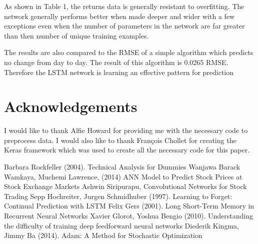 \documentclass[11pt]{article}
\begin{document}
As shown in Table 1, the returns data is generally resistant to overfitting. The network generally performs better when made deeper and wider with a few exceptions even when the number of parameters in the network are far greater than then number of unique training examples.

The results are also compared to the RMSE of a simple algorithm which predicts no change from day to day. The result of this algorithm is 0.0265 RMSE. Therefore the LSTM network is learning an effective pattern for prediction

\section*{Acknowledgements}

I would like to thank Alfie Howard for providing me with the necessary code to preprocess data. I would also like to thank Fran\c{c}ois Chollet for creating the Keras framework which was used to create all the necessary code for this paper.

\begin{thebibliography}{9}

 Barbara Rockfeller (2004). Technical Analysis for Dummies
 Wanjawa Barack Wamkaya, Muchemi Lawrence, (2014) ANN Model to Predict Stock Prices at Stock Exchange Markets
 Ashwin Siripurapu, Convolutional Networks for Stock Trading
 Sepp Hochreiter, Jurgen Schmidhuber (1997). Learning to Forget: Continual Prediction with LSTM
 Felix Gers (2001). Long Short-Term Memory in Recurrent Neural Networks
 Xavier Glorot, Yoshua Bengio (2010). Understanding the difficulty of training deep feedforward neural networks
 Diederik Kingma, Jimmy Ba (2014). Adam: A Method for Stochastic Optimization

\end{thebibliography}
\end{document}
